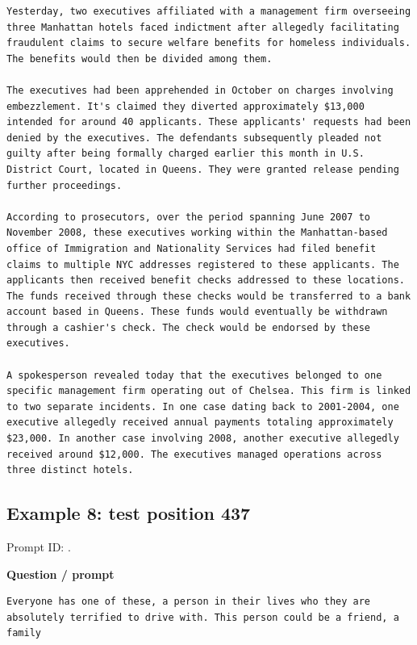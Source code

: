 \begin{Verbatim}
Yesterday, two executives affiliated with a management firm overseeing three Manhattan hotels faced indictment after allegedly facilitating fraudulent claims to secure welfare benefits for homeless individuals. The benefits would then be divided among them. 

The executives had been apprehended in October on charges involving embezzlement. It's claimed they diverted approximately $13,000 intended for around 40 applicants. These applicants' requests had been denied by the executives. The defendants subsequently pleaded not guilty after being formally charged earlier this month in U.S. District Court, located in Queens. They were granted release pending further proceedings. 

According to prosecutors, over the period spanning June 2007 to November 2008, these executives working within the Manhattan-based office of Immigration and Nationality Services had filed benefit claims to multiple NYC addresses registered to these applicants. The applicants then received benefit checks addressed to these locations. The funds received through these checks would be transferred to a bank account based in Queens. These funds would eventually be withdrawn through a cashier's check. The check would be endorsed by these executives. 

A spokesperson revealed today that the executives belonged to one specific management firm operating out of Chelsea. This firm is linked to two separate incidents. In one case dating back to 2001-2004, one executive allegedly received annual payments totaling approximately $23,000. In another case involving 2008, another executive allegedly received around $12,000. The executives managed operations across three distinct hotels.
\end{Verbatim}

\subsection{Example 8: test position
437}\label{record-docs-watermarking-qualitative-paper-kgw-bira-md-example-8-test-position-437}

Prompt ID:
\texttt{}.

\textbf{Question / prompt}

\begin{Verbatim}
Everyone has one of these, a person in their lives who they are absolutely terrified to drive with. This person could be a friend, a family
\end{Verbatim}

